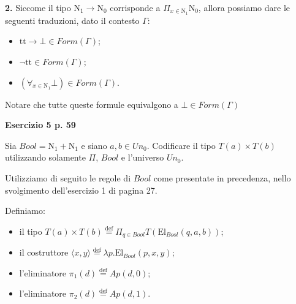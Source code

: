 \documentclass[a4paper]{letter}
\newcommand{\defas}[0]{\stackrel{\text{def}}{=}}
\begin{document}
\textbf{2.}
Siccome il tipo $\text{N}_1 \rightarrow \text{N}_0$ corrisponde a $\Pi_{x \in \text{N}_1} \text{N}_0$, allora possiamo dare le seguenti traduzioni, dato il contesto $\Gamma$:
\begin{itemize}
    \item $\text{tt} \rightarrow \bot \in Form(\Gamma)$;
    \item $\neg \text{tt} \in Form(\Gamma)$;
    \item $(\forall_{x \in \text{N}_1} \bot) \in Form(\Gamma)$.
\end{itemize}
Notare che tutte queste formule equivalgono a $\bot \in Form(\Gamma)$

\clearpage

\textbf{Esercizio 5 p. 59}

Sia $Bool = \text{N}_1 + \text{N}_1$ e siano $a, b \in Un_0$. Codificare il tipo $T(a) \times T(b)$ utilizzando solamente $\Pi$, $Bool$ e l'universo $Un_0$.
 
Utilizziamo di seguito le regole di $Bool$ come presentate in precedenza, nello svolgimento dell'esercizio 1 di pagina 27.

Definiamo:
\begin{itemize}
    \item il tipo $T(a) \times T(b) \defas \Pi_{q \in Bool} T(\text{El}_{Bool}(q, a, b))$;
    \item il costruttore $\langle x, y\rangle \defas \lambda p . \text{El}_{Bool}(p, x, y)$; 
    \item l'eliminatore $\pi_1(d) \defas Ap(d, 0)$; 
    \item l'eliminatore $\pi_2(d) \defas Ap(d, 1)$.
\end{itemize}


\end{document}
